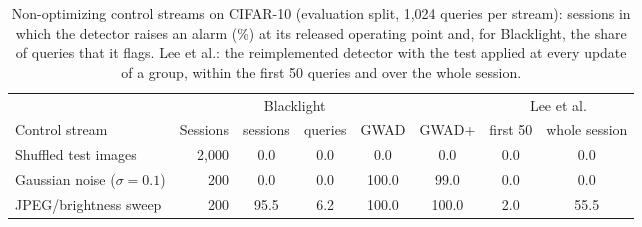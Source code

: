 \begin{table}[!tbp]
\centering\footnotesize\setlength{\tabcolsep}{4pt}
\caption{Non-optimizing control streams on CIFAR-10 (evaluation split, 1{,}024 queries per stream): sessions in which the detector raises an alarm (\%) at its released operating point and, for Blacklight, the share of queries that it flags. Lee et al.: the reimplemented detector with the test applied at every update of a group, within the first 50 queries and over the whole session.}
\label{tab:controls}
\vspace{3pt}
\begin{adjustbox}{max width=\textwidth}
\begin{tabular}{lrcccccc}
\toprule
& & \multicolumn{2}{c}{Blacklight} & & & \multicolumn{2}{c}{Lee et al.} \\
\cmidrule(lr){3-4}\cmidrule(lr){7-8}
Control stream & Sessions & sessions & queries & GWAD & GWAD+ & first 50 & whole session \\
\midrule
Shuffled test images & 2{,}000 & 0.0 & 0.0 & 0.0 & 0.0 & 0.0 & 0.0 \\
Gaussian noise ($\sigma=0.1$) & 200 & 0.0 & 0.0 & 100.0 & 99.0 & 0.0 & 0.0 \\
JPEG/brightness sweep & 200 & 95.5 & 6.2 & 100.0 & 100.0 & 2.0 & 55.5 \\
\bottomrule
\end{tabular}
\end{adjustbox}
\end{table}
